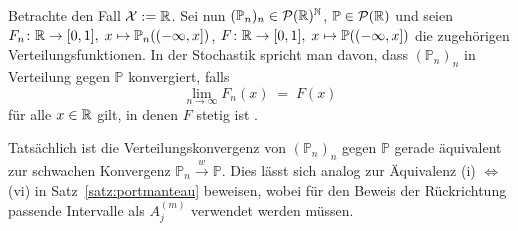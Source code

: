 \documentclass[../thesis/thesis.tex]{subfiles}
\begin{document}
	\begin{Bemerkung}[Verteilungskonvergenz]
		Betrachte den Fall $\mathcal{X} := \mathbb{R}$. Sei nun $(\mathbb{P}_n)_n \in \mathcal{P}(\mathbb{R})^{\mathbb{N}}$,  $\mathbb{P} \in \mathcal{P}(\mathbb{R})$ und seien $F_n \colon \mathbb{R} \to [0, 1], \; x \mapsto \mathbb{P}_n((-\infty, x]) $, $F \colon \mathbb{R} \to [0, 1], \; x \mapsto \mathbb{P}((-\infty, x]) $ die zugehörigen Verteilungsfunktionen. In der Stochastik spricht man davon, dass $(\mathbb{P}_n)_n$ in Verteilung gegen $\mathbb{P}$ konvergiert, falls 
		\[ \lim_{n \to \infty} F_n(x) \; = \; F(x) \]
		für alle $x \in \mathbb{R}$ gilt, in denen $F$ stetig ist \cite[Definition 6.1]{Henze.2016}. 
		
		Tatsächlich ist die Verteilungskonvergenz von $(\mathbb{P}_n)_n$ gegen $\mathbb{P}$ gerade äquivalent zur schwachen Konvergenz $\mathbb{P}_n \xrightarrow{w} \mathbb{P}$. Dies lässt sich analog zur Äquivalenz (i) $\Leftrightarrow$ (vi) in Satz~\ref{satz:portmanteau} beweisen, wobei für den Beweis der Rückrichtung passende Intervalle als $A_j^{(m)}$ verwendet werden müssen.
	\end{Bemerkung}
	
\end{document}
